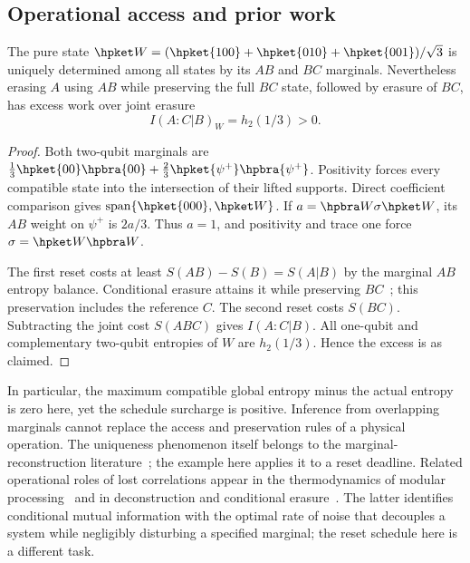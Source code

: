 \subsection{Operational access and prior work}\label{hp:sec:access}
\begin{proposition}\label{hp:prop:W}
The pure state $\hpket W=(\hpket{100}+\hpket{010}+\hpket{001})/\sqrt3$ is uniquely determined among all states by its $AB$ and $BC$ marginals. Nevertheless erasing $A$ using $AB$ while preserving the full $BC$ state, followed by erasure of $BC$, has excess work over joint erasure
\[
 I(A:C|B)_W=h_2(1/3)>0.
\]
\end{proposition}
\begin{proof}
Both two-qubit marginals are $\frac13\hpket{00}\hpbra{00}+\frac23\hpket{\psi^+}\hpbra{\psi^+}$. Positivity forces every compatible state into the intersection of their lifted supports. Direct coefficient comparison gives $\operatorname{span}\{\hpket{000},\hpket W\}$. If $a=\hpbra W\sigma\hpket W$, its $AB$ weight on $\psi^+$ is $2a/3$. Thus $a=1$, and positivity and trace one force $\sigma=\hpket W\hpbra W$.

The first reset costs at least $S(AB)-S(B)=S(A|B)$ by the marginal $AB$ entropy balance. Conditional erasure attains it while preserving $BC$~\cite[Corollary 2 and Appendix A]{delRio11}; this preservation includes the reference $C$. The second reset costs $S(BC)$. Subtracting the joint cost $S(ABC)$ gives $I(A:C|B)$. All one-qubit and complementary two-qubit entropies of $W$ are $h_2(1/3)$. Hence the excess is as claimed.
\end{proof}

In particular, the maximum compatible global entropy minus the actual entropy is zero here, yet the schedule surcharge is positive. Inference from overlapping marginals cannot replace the access and preservation rules of a physical operation. The uniqueness phenomenon itself belongs to the marginal-reconstruction literature~\cite{HPlpw}; the example here applies it to a reset deadline. Related operational roles of lost correlations appear in the thermodynamics of modular processing~\cite{BMC18} and in deconstruction and conditional erasure~\cite{HPconditionaldecoupling,HPdeconstruction}. The latter identifies conditional mutual information with the optimal rate of noise that decouples a system while negligibly disturbing a specified marginal; the reset schedule here is a different task.


